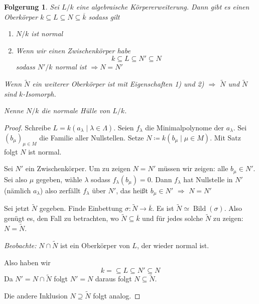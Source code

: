 \documentclass[a4paper,12pt,numbers=noenddot,parskip=full]{scrartcl}
\theoremstyle{dotless}
\newtheorem{corollary}[theorem]{Folgerung}
\theoremstyle{remark}
\begin{document}
	\begin{corollary}
		Sei $L/k$ eine algebraische Körpererweiterung. Dann gibt es einen Oberkörper $k \subseteq L \subseteq N \subseteq \overline{k}$ sodass gilt
		\begin{enumerate}
			\item $N/k$ ist normal
			\item Wenn wir einen Zwischenkörper habe
			\begin{equation*}
				k \subseteq L \subseteq N' \subseteq N
			\end{equation*}
			sodass $N'/k$ normal ist $\Rightarrow N = N'$
		\end{enumerate}
		Wenn $\tilde{N}$ ein weiterer Oberkörper ist mit Eigenschaften 1) und 2) $\Rightarrow$ $\tilde{N}$ und $\tilde{N}$ sind $k$-Isomorph.
		
		Nenne $N/k$ die normale Hülle von $L/k$.
	\end{corollary}

	\begin{proof}
		Schreibe $L = k(a_\lambda \mid \lambda \in \Lambda)$. Seien $f_\lambda$ die Minimalpolynome der $a_\lambda$. Sei $(b_\mu)_{\mu \in M}$ die Familie aller Nullstellen. Setze $N \coloneqq k(b_\mu \mid \mu \in M)$. Mit Satz folgt $N$ ist normal.
		
		Sei $N'$ ein Zwischenkörper. Um zu zeigen $N = N'$ müssen wir zeigen: alle $b_\mu \in N'$. Sei also $\mu$ gegeben, wähle $\lambda$ sodass $f_\lambda(b_\mu) = 0$. Dann $f_\lambda$ hat Nullstelle in $N'$ (nämlich $a_\lambda$) also zerfällt $f_\lambda$ über $N'$, das heißt $b_\mu \in N'$ $\Rightarrow$ $N = N'$
		
		Sei jetzt $\tilde{N}$ gegeben. Finde Einbettung $\sigma: \tilde{N} \to \overline{k}$. Es ist $\tilde{N} \simeq \operatorname{Bild}(\sigma)$. Also genügt es, den Fall zu betrachten, wo $\tilde{N} \subseteq \overline{k}$ und für jedes solche $\tilde{N}$ zu zeigen: $N = \tilde{N}$.
		
		\textit{Beobachte:} $N \cap \tilde{N}$ ist ein Oberkörper von $L$, der wieder normal ist.
		
		Also haben wir
		\begin{equation*}
			k = \subseteq L \subseteq N' \subseteq N
		\end{equation*}
		Da $N' = N \cap \tilde{N}$ folgt $N' = N$ daraus folgt $N \subseteq \tilde{N}$.
		
		Die andere Inklusion $N \supseteq \tilde{N}$ folgt analog.
	\end{proof}
\end{document}
